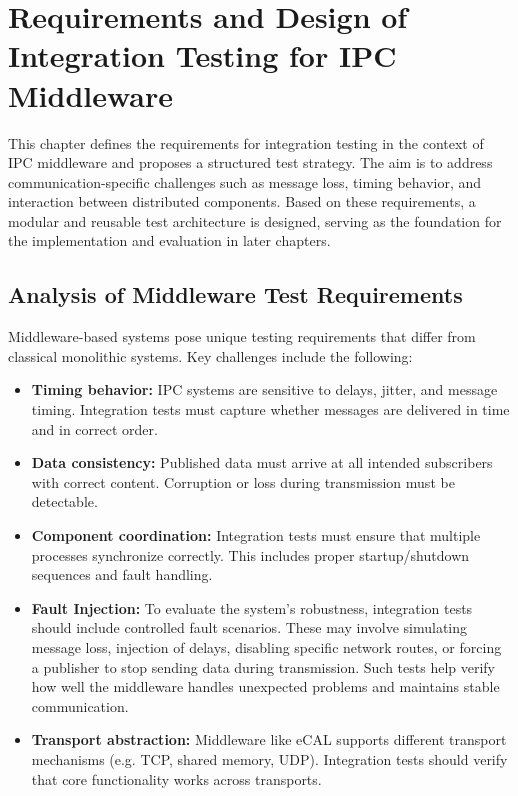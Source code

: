 \clearpage

\section{Requirements and Design of Integration Testing for IPC Middleware}

This chapter defines the requirements for integration testing in the context of IPC middleware and proposes a structured test strategy. The aim is to address communication-specific challenges such as message loss, timing behavior, and interaction between distributed components. Based on these requirements, a modular and reusable test architecture is designed, serving as the foundation for the implementation and evaluation in later chapters.

\subsection{Analysis of Middleware Test Requirements}

Middleware-based systems pose unique testing requirements that differ from classical monolithic systems. Key challenges include the following:

\begin{itemize}
	\item \textbf{Timing behavior:} IPC systems are sensitive to delays, jitter, and message timing. Integration tests must capture whether messages are delivered in time and in correct order.
	
	\item \textbf{Data consistency:} Published data must arrive at all intended subscribers with correct content. Corruption or loss during transmission must be detectable.
	
	\item \textbf{Component coordination:} Integration tests must ensure that multiple processes synchronize correctly. This includes proper startup/shutdown sequences and fault handling.
	
	\item \textbf{Fault Injection:} To evaluate the system’s robustness, integration tests should include controlled fault scenarios. These may involve simulating message loss, injection of delays, disabling specific network routes, or forcing a publisher to stop sending data during transmission. Such tests help verify how well the middleware handles unexpected problems and maintains stable communication.
	
	\item \textbf{Transport abstraction:} Middleware like eCAL supports different transport mechanisms (e.g. TCP, shared memory, UDP). Integration tests should verify that core functionality works across transports.
\end{itemize}


